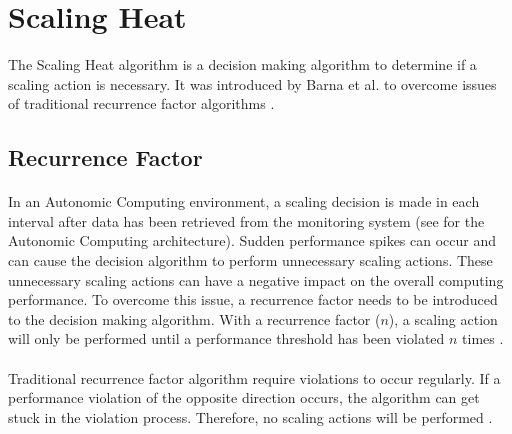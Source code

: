 \section{Scaling Heat}
\label{sec:04_scal-heat}
The Scaling Heat algorithm is a decision making algorithm to determine if a scaling action is necessary.
It was introduced by Barna et al. \cite{Barna2017ElasticContainerApps} to overcome issues of traditional recurrence factor algorithms \cite{Barna2017ElasticContainerApps}.


\subsection{Recurrence Factor}
\paragraph{}In an Autonomic Computing environment, a scaling decision is made in each interval after data has been retrieved from the monitoring system (see  for the Autonomic Computing architecture). 
Sudden performance spikes can occur and can cause the decision algorithm to perform unnecessary scaling actions.
These unnecessary scaling actions can have a negative impact on the overall computing performance.
To overcome this issue, a recurrence factor needs to be introduced to the decision making algorithm.
With a recurrence factor ($n$), a scaling action will only be performed until a performance threshold has been violated $n$ times \cite{Barna2017ElasticContainerApps}.


\paragraph{}Traditional recurrence factor algorithm require violations to occur regularly. If a performance violation of the opposite direction occurs, the algorithm can get stuck in the violation process. Therefore, no scaling actions will be performed \cite{Barna2017ElasticContainerApps}.


